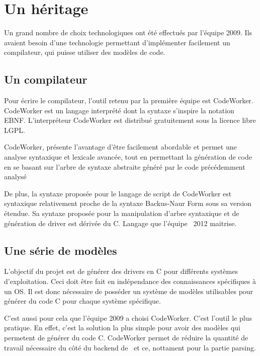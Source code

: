 \documentclass{rtxreport}
\newcommand{\note}[1]{\marginpar{\scriptsize{\textdagger\ #1}}}
\begin{document}
\section{Un héritage}

Un grand nombre de choix technologiques ont été effectués par l'équipe 2009.
Ils avaient besoin d'une technologie permettant d'implémenter facilement un
compilateur, qui puisse utiliser des modèles de code.

\subsection{Un compilateur}

Pour écrire le compilateur, l'outil retenu par la première équipe est
CodeWorker. CodeWorker est un langage interprété dont la syntaxe s'inspire la
notation EBNF. L'interpréteur CodeWorker est distribué gratuitement sous la
licence libre LGPL.

CodeWorker, présente l'avantage d'être facilement abordable et permet une
analyse syntaxique et lexicale avancée, tout en permettant la génération de
code en se basant sur l'arbre de syntaxe abstraite généré par le code
précédemment analysé

De plus, la syntaxe proposée pour le langage de script de CodeWorker est
syntaxique relativement proche de la syntaxe Backus-Naur Form 
sous sa version étendue.  Sa syntaxe proposée pour la manipulation
d'arbre syntaxique et de génération de driver est dérivée du C. 
Langage que l'équipe \rtx\ 2012 maitrise.

\subsection{Une série de modèles}


L'objectif du projet est de générer des drivers en C pour différents systèmes
d'exploitation. Ceci doit être fait en indépendance des 
connaissances spécifiques à un OS. Il est donc nécessaire de posséder un
système de modèles utilisables pour générer du code C pour chaque système
spécifique.

C'est aussi pour cela que l'équipe 2009 a choisi CodeWorker. C'est l'outil le plus
pratique. En effet, c'est la solution la plus simple pour avoir des modèles 
qui permetent de générer du code C.
CodeWorker permet de réduire la quantité de travail nécessaire
du côté du backend de \rtx\ et ce, nottament pour la partie parsing.
\end{document}
